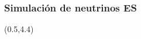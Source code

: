 \begin{frame}
 \frametitle{Simulaci\'on de neutrinos ES}
 \begin{textblock}{14.5}(0.5,4.4)
 \end{textblock}
 
\end{frame}
